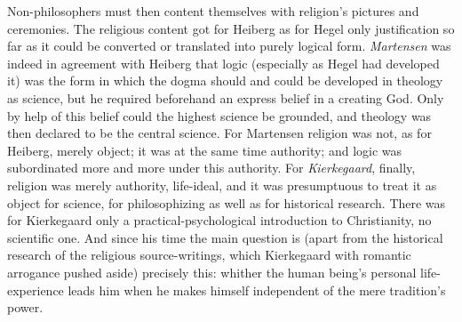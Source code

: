 \documentclass[12pt,a4paper]{book}
\newcommand{\opage}[1]{\marginnote{\footnotesize\textit{[#1]}}}
\begin{document}
\opage{381}Non-philosophers must then content themselves with religion's pictures and ceremonies. The religious
content got for Heiberg as for Hegel only justification so far as it could be converted or translated into
purely logical form. \emph{Martensen} was indeed in agreement with Heiberg that logic (especially as Hegel
had developed it) was the form in which the dogma should and could be developed in theology as science, but
he required beforehand an express belief in a creating God. Only by help of this belief could the highest
science be grounded, and theology was then declared to be the central science. For Martensen religion was
not, as for Heiberg, merely object; it was at the same time authority; and logic was subordinated more and
more under this authority. For \emph{Kierkegaard}, finally, religion was merely authority, life-ideal, and
it was presumptuous to treat it as object for science, for philosophizing as well as for historical
research. There was for Kierkegaard only a practical-psychological introduction to Christianity, no
scientific one. And since his time the main question is (apart from the historical research of the
religious source-writings, which Kierkegaard with romantic arrogance pushed aside) precisely this: whither
the human being's personal life-experience leads him when he makes himself independent of the mere
tradition's power.
\end{document}

